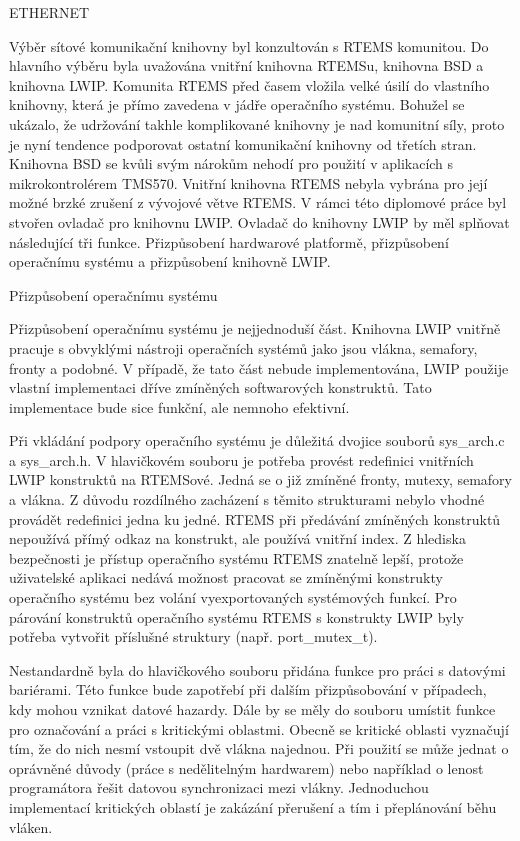 \sec ETHERNET

	Výběr sítové komunikační knihovny byl konzultován s RTEMS komunitou. Do hlavního výběru byla uvažována vnitřní knihovna RTEMSu, knihovna BSD a knihovna LWIP. Komunita RTEMS před časem vložila velké úsilí do vlastního knihovny, která je přímo zavedena v jádře operačního systému. Bohužel se ukázalo, že udržování takhle komplikované knihovny je nad komunitní síly, proto je nyní tendence podporovat ostatní komunikační knihovny od třetích stran. Knihovna BSD se kvůli svým nárokům nehodí pro použití v aplikacích s mikrokontrolérem TMS570. Vnitřní knihovna RTEMS nebyla vybrána pro její možné brzké zrušení z vývojové větve RTEMS. V rámci této diplomové práce byl stvořen ovladač pro knihovnu LWIP. Ovladač do knihovny LWIP by měl splňovat následující tři funkce. Přizpůsobení hardwarové platformě, přizpůsobení operačnímu systému a přizpůsobení knihovně LWIP. 

\secc Přizpůsobení operačnímu systému

Přizpůsobení operačnímu systému je nejjednoduší část. Knihovna LWIP vnitřně pracuje s obvyklými nástroji operačních systémů jako jsou vlákna, semafory, fronty a podobné. V případě, že tato část nebude implementována, LWIP použije vlastní implementaci dříve zmíněných softwarových konstruktů. Tato implementace bude sice funkční, ale nemnoho efektivní.

Při vkládání podpory operačního systému je důležitá dvojice souborů sys\_arch.c a sys\_arch.h. V hlavičkovém souboru je potřeba provést redefinici vnitřních LWIP konstruktů na RTEMSové. Jedná se o již zmíněné fronty, mutexy, semafory a vlákna. Z důvodu rozdílného zacházení s těmito strukturami nebylo vhodné provádět redefinici jedna ku jedné. RTEMS při předávání zmíněných konstruktů nepoužívá přímý odkaz na konstrukt, ale používá vnitřní index. Z hlediska bezpečnosti je přístup operačního systému RTEMS znatelně lepší, protože uživatelské aplikaci nedává možnost pracovat se zmíněnými konstrukty operačního systému bez volání vyexportovaných systémových funkcí. Pro párování konstruktů operačního systému RTEMS s konstrukty LWIP byly potřeba vytvořit příslušné struktury (např. port\_mutex\_t).{}

Nestandardně byla do hlavičkového souboru přidána funkce pro práci s datovými bariérami. Této funkce bude zapotřebí při dalším přizpůsobování v případech, kdy mohou vznikat datové hazardy. Dále by se měly do souboru umístit funkce pro označování a práci s kritickými oblastmi. Obecně se kritické oblasti vyznačují tím, že do nich nesmí vstoupit dvě vlákna najednou. Při použití se může jednat o oprávněné důvody (práce s nedělitelným hardwarem) nebo například o lenost programátora řešit datovou synchronizaci mezi vlákny. Jednoduchou implementací kritických oblastí je zakázání přerušení a tím i přeplánování běhu vláken.

